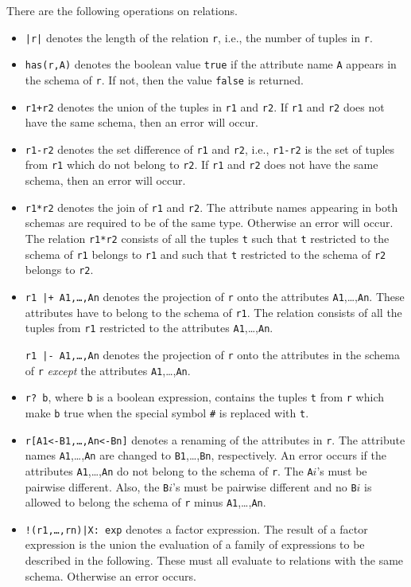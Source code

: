 \documentclass[a4,14pt,latin1]{article}
\begin{document}
There are the following operations on relations.
\begin{itemize}
\item
{\tt |r|} denotes the length of the relation {\tt r}, i.e., the
number of tuples in {\tt r}.
\item
{\tt has(r,A)} denotes the boolean value {\tt true} if the attribute name
{\tt A} appears in the schema of {\tt r}.
If not, then the value {\tt false} is returned.
\item
{\tt r1+r2} denotes the union of the tuples in {\tt r1} and {\tt r2}.
If {\tt r1} and {\tt r2} does not have the same schema, then an error will
occur.
\item
{\tt r1-r2} denotes the set difference of {\tt r1} and {\tt r2}, i.e.,
{\tt r1-r2} is the set of tuples from {\tt r1} which do not belong to {\tt r2}.
If {\tt r1} and {\tt r2} does not have the same schema, then an error will
occur.
\item
{\tt r1*r2} denotes the join of {\tt r1} and {\tt r2}. The attribute names
appearing in both schemas are required to be of the same type. Otherwise
an error will occur. The relation {\tt r1*r2} consists of all the tuples
{\tt t} such that {\tt t} restricted to the schema of {\tt r1} belongs to
{\tt r1} and such that {\tt t} restricted to the schema of {\tt r2}
belongs to {\tt r2}.
\item
{\tt r1 |+ A1,\ldots,An} denotes the projection of {\tt r} onto
the attributes {\tt A1},\ldots,{\tt An}. These attributes have to belong
to the schema of {\tt r1}. The relation consists of all the tuples
from {\tt r1} restricted to the attributes {\tt A1},\ldots,{\tt An}.

{\tt r1 |- A1,\ldots,An} denotes the projection of {\tt r} onto the
attributes in the schema of {\tt r} {\em except\/} the attributes
{\tt A1},\ldots,{\tt An}.
\item
{\tt r?\ b}, where {\tt b} is a boolean expression, contains the tuples {\tt t}
from {\tt r} which make {\tt b} true when the special symbol {\tt \#} is
replaced with {\tt t}.
\item
{\tt r[A1<-B1,\ldots,An<-Bn]} denotes a renaming of the attributes in
{\tt r}. The attribute names {\tt A1},\ldots,{\tt An} are changed
to {\tt B1},\ldots,{\tt Bn}, respectively.
An error occurs if the attributes {\tt A1},\ldots,{\tt An} do not
belong to the schema of {\tt r}. The {\tt A}$i$'s must be pairwise different.
Also, the {\tt B}$i$'s must be pairwise different
and no {\tt B}$i$ is allowed to belong the schema of {\tt r} minus
{\tt A1},\ldots,{\tt An}.
\item
{\tt !(r1,\ldots,rn)|X:\ exp} denotes a factor expression.
The result of a factor expression is the union the evaluation
of a family of expressions to be described in the following.
These must all evaluate to relations with the same schema.
Otherwise an error occurs.


\end{itemize}
\end{document}
